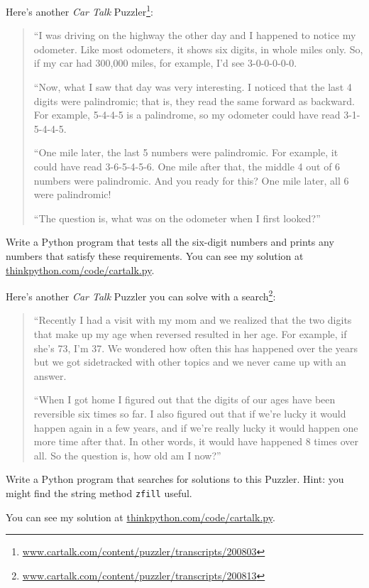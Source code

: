 \documentclass[10pt]{book}
\begin{document}
\begin{ex}
Here's another {\em Car Talk}
Puzzler\footnote{\url{www.cartalk.com/content/puzzler/transcripts/200803}}:


\begin{quote}
``I was driving on the highway the other day and I happened to
notice my odometer. Like most odometers, it shows six digits,
in whole miles only. So, if my car had 300,000
miles, for example, I'd see 3-0-0-0-0-0.

``Now, what I saw that day was very interesting. I noticed that the
last 4 digits were palindromic; that is, they read the same forward as
backward. For example, 5-4-4-5 is a palindrome, so my odometer
could have read 3-1-5-4-4-5.

``One mile later, the last 5 numbers were palindromic. For example, it
could have read 3-6-5-4-5-6.  One mile after that, the middle 4 out of
6 numbers were palindromic.  And you ready for this? One mile later,
all 6 were palindromic!

``The question is, what was on the odometer when I first looked?''
\end{quote}

Write a Python program that tests all the six-digit numbers and prints
any numbers that satisfy these requirements.  You can see my solution
at \url{thinkpython.com/code/cartalk.py}.

\end{ex}


\begin{ex}
Here's another {\em Car Talk} Puzzler you can solve with a
search\footnote{\url{www.cartalk.com/content/puzzler/transcripts/200813}}:


\begin{quote}
``Recently I had a visit with my mom and we realized that
the two digits that make up my age when reversed resulted in her
age. For example, if she's 73, I'm 37. We wondered how often this has
happened over the years but we got sidetracked with other topics and
we never came up with an answer.

``When I got home I figured out that the digits of our ages have been
reversible six times so far. I also figured out that if we're lucky it
would happen again in a few years, and if we're really lucky it would
happen one more time after that. In other words, it would have
happened 8 times over all. So the question is, how old am I now?''

\end{quote}

Write a Python program that searches for solutions to this Puzzler.
Hint: you might find the string method {\tt zfill} useful.

You can see my solution at \url{thinkpython.com/code/cartalk.py}.

\end{ex}
\end{document}
